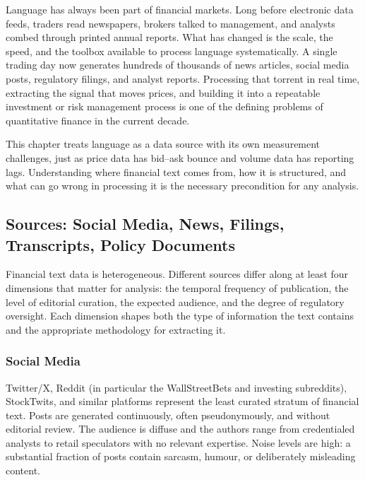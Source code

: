 \begin{context}

Language has always been part of financial markets. Long before electronic data feeds, traders read newspapers, brokers talked to management, and analysts combed through printed annual reports. What has changed is the scale, the speed, and the toolbox available to process language systematically. A single trading day now generates hundreds of thousands of news articles, social media posts, regulatory filings, and analyst reports. Processing that torrent in real time, extracting the signal that moves prices, and building it into a repeatable investment or risk management process is one of the defining problems of quantitative finance in the current decade.

This chapter treats language as a data source with its own measurement challenges, just as price data has bid--ask bounce and volume data has reporting lags. Understanding where financial text comes from, how it is structured, and what can go wrong in processing it is the necessary precondition for any analysis.

\end{context}

\subsection{Sources: Social Media, News, Filings, Transcripts, Policy Documents}
\label{sec:ch09-text-sources}

Financial text data is heterogeneous. Different sources differ along at least four dimensions that matter for analysis: the temporal frequency of publication, the level of editorial curation, the expected audience, and the degree of regulatory oversight. Each dimension shapes both the type of information the text contains and the appropriate methodology for extracting it.

\subsubsection*{Social Media}

Twitter/X, Reddit (in particular the WallStreetBets and investing subreddits), StockTwits, and similar platforms represent the least curated stratum of financial text. Posts are generated continuously, often pseudonymously, and without editorial review. The audience is diffuse and the authors range from credentialed analysts to retail speculators with no relevant expertise. Noise levels are high: a substantial fraction of posts contain sarcasm, humour, or deliberately misleading content.

